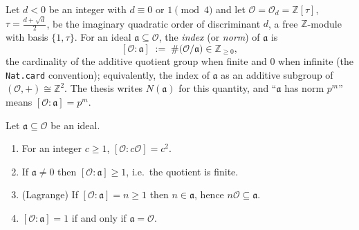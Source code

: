 %

\begin{definition}\label{infra-index}
  Let $d < 0$ be an integer with $d \equiv 0$ or $1 \pmod 4$ and let
  $\mathcal{O} = \mathcal{O}_d = \mathbb{Z}[\tau]$, $\tau = \tfrac{d + \sqrt{d}}{2}$, be the
  imaginary quadratic order of discriminant $d$, a free $\mathbb{Z}$-module with basis
  $\{1, \tau\}$. For an ideal $\mathfrak{a} \subseteq \mathcal{O}$, the \emph{index} (or
  \emph{norm}) of $\mathfrak{a}$ is
  \[
    [\mathcal{O} : \mathfrak{a}] \;:=\; \#\bigl(\mathcal{O}/\mathfrak{a}\bigr)
    \in \mathbb{Z}_{\ge 0},
  \]
  the cardinality of the additive quotient group when finite and $0$ when infinite (the
  \texttt{Nat.card} convention); equivalently, the index of $\mathfrak{a}$ as an additive
  subgroup of $(\mathcal{O}, +) \cong \mathbb{Z}^2$. The thesis writes $N(\mathfrak{a})$ for
  this quantity, and ``$\mathfrak{a}$ has norm $p^m$'' means
  $[\mathcal{O} : \mathfrak{a}] = p^m$.
\end{definition}

\begin{lemma}\label{infra-index-basic}
  Let $\mathfrak{a} \subseteq \mathcal{O}$ be an ideal.
  \begin{enumerate}
    \item For an integer $c \ge 1$, $[\mathcal{O} : c\mathcal{O}] = c^2$.
    \item If $\mathfrak{a} \ne 0$ then $[\mathcal{O} : \mathfrak{a}] \ge 1$, i.e.\ the
      quotient is finite.
    \item (Lagrange) If $[\mathcal{O} : \mathfrak{a}] = n \ge 1$ then $n \in \mathfrak{a}$,
      hence $n\mathcal{O} \subseteq \mathfrak{a}$.
    \item $[\mathcal{O} : \mathfrak{a}] = 1$ if and only if $\mathfrak{a} = \mathcal{O}$.
  \end{enumerate}
\end{lemma}


